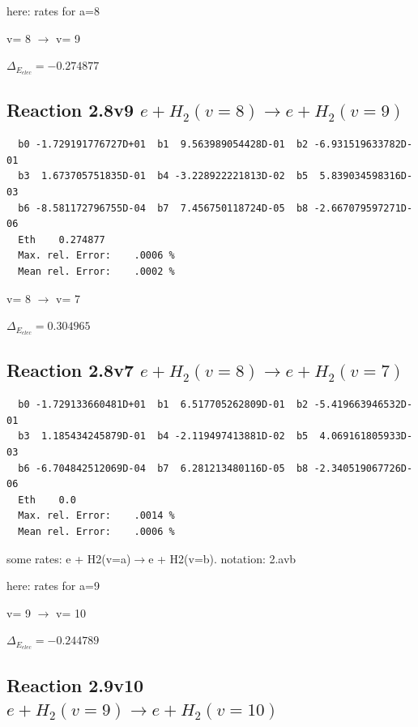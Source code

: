 \documentclass[12pt,dvipdfmx]{article}
\begin{document}
here: rates for a=8


  v=  8 $\rightarrow$ v= 9

$\Delta_{E_{elec}}=-0.274877$


\subsection{
Reaction 2.8v9
$ e + H_2(v=8) \rightarrow e + H_2(v=9) $
}

\begin{small}\begin{verbatim}
  b0 -1.729191776727D+01  b1  9.563989054428D-01  b2 -6.931519633782D-01
  b3  1.673705751835D-01  b4 -3.228922221813D-02  b5  5.839034598316D-03
  b6 -8.581172796755D-04  b7  7.456750118724D-05  b8 -2.667079597271D-06
  Eth    0.274877
  Max. rel. Error:    .0006 %
  Mean rel. Error:    .0002 %

\end{verbatim}\end{small}

  v=  8 $\rightarrow$ v= 7

$\Delta_{E_{elec}}= 0.304965$


\subsection{
Reaction 2.8v7
$ e + H_2(v=8) \rightarrow e + H_2(v=7) $
}


\begin{small}\begin{verbatim}
  b0 -1.729133660481D+01  b1  6.517705262809D-01  b2 -5.419663946532D-01
  b3  1.185434245879D-01  b4 -2.119497413881D-02  b5  4.069161805933D-03
  b6 -6.704842512069D-04  b7  6.281213480116D-05  b8 -2.340519067726D-06
  Eth    0.0
  Max. rel. Error:    .0014 %
  Mean rel. Error:    .0006 %

\end{verbatim}\end{small}
\newpage
some rates: e + H2(v=a)$\rightarrow$e + H2(v=b). notation: 2.avb

here: rates for a=9


  v=  9 $\rightarrow$ v= 10

$\Delta_{E_{elec}}=-0.244789$


\subsection{
Reaction 2.9v10
$ e + H_2(v=9) \rightarrow e + H_2(v=10) $
}
\end{document}
